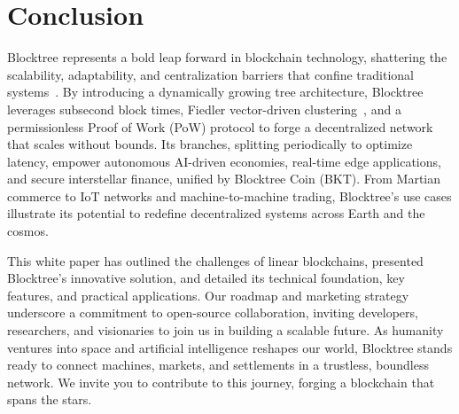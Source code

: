\section{Conclusion}
Blocktree represents a bold leap forward in blockchain technology, shattering the scalability, adaptability, and centralization barriers that confine traditional systems~\cite{nakamoto2008bitcoin, buterin2014ethereum}. By introducing a dynamically growing tree architecture, Blocktree leverages subsecond block times, Fiedler vector-driven clustering~\cite{ng2001spectral}, and a permissionless Proof of Work (PoW) protocol to forge a decentralized network that scales without bounds. Its branches, splitting periodically to optimize latency, empower autonomous AI-driven economies, real-time edge applications, and secure interstellar finance, unified by Blocktree Coin (BKT). From Martian commerce to IoT networks and machine-to-machine trading, Blocktree’s use cases illustrate its potential to redefine decentralized systems across Earth and the cosmos.

This white paper has outlined the challenges of linear blockchains, presented Blocktree’s innovative solution, and detailed its technical foundation, key features, and practical applications. Our roadmap and marketing strategy underscore a commitment to open-source collaboration, inviting developers, researchers, and visionaries to join us in building a scalable future. As humanity ventures into space and artificial intelligence reshapes our world, Blocktree stands ready to connect machines, markets, and settlements in a trustless, boundless network. We invite you to contribute to this journey, forging a blockchain that spans the stars.